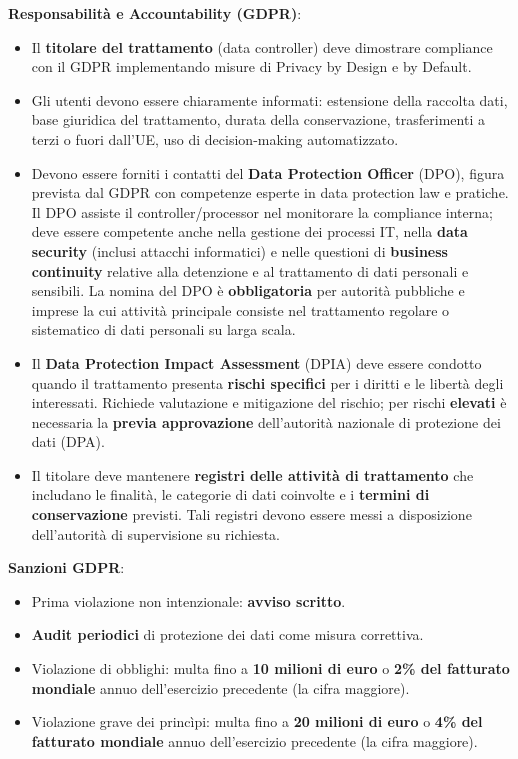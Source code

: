 \documentclass[a4paper,11pt]{article}
\begin{document}
\textbf{Responsabilit\`{a} e Accountability (GDPR)}:
\begin{itemize}
  \item Il \textbf{titolare del trattamento} (data controller) deve dimostrare compliance con il GDPR implementando misure di Privacy by Design e by Default.
  \item Gli utenti devono essere chiaramente informati: estensione della raccolta dati, base giuridica del trattamento, durata della conservazione, trasferimenti a terzi o fuori dall'UE, uso di decision-making automatizzato.
  \item Devono essere forniti i contatti del \textbf{Data Protection Officer} (DPO), figura prevista dal GDPR con competenze esperte in data protection law e pratiche. Il DPO assiste il controller/processor nel monitorare la compliance interna; deve essere competente anche nella gestione dei processi IT, nella \textbf{data security} (inclusi attacchi informatici) e nelle questioni di \textbf{business continuity} relative alla detenzione e al trattamento di dati personali e sensibili. La nomina del DPO \`{e} \textbf{obbligatoria} per autorit\`{a} pubbliche e imprese la cui attivit\`{a} principale consiste nel trattamento regolare o sistematico di dati personali su larga scala.
  \item Il \textbf{Data Protection Impact Assessment} (DPIA) deve essere condotto quando il trattamento presenta \textbf{rischi specifici} per i diritti e le libert\`{a} degli interessati. Richiede valutazione e mitigazione del rischio; per rischi \textbf{elevati} \`{e} necessaria la \textbf{previa approvazione} dell'autorit\`{a} nazionale di protezione dei dati (DPA).
  \item Il titolare deve mantenere \textbf{registri delle attivit\`{a} di trattamento} che includano le finalit\`{a}, le categorie di dati coinvolte e i \textbf{termini di conservazione} previsti. Tali registri devono essere messi a disposizione dell'autorit\`{a} di supervisione su richiesta.
\end{itemize}

\textbf{Sanzioni GDPR}:
\begin{itemize}
  \item Prima violazione non intenzionale: \textbf{avviso scritto}.
  \item \textbf{Audit periodici} di protezione dei dati come misura correttiva.
  \item Violazione di obblighi: multa fino a \textbf{10 milioni di euro} o \textbf{2\% del fatturato mondiale} annuo dell'esercizio precedente (la cifra maggiore).
  \item Violazione grave dei princìpi: multa fino a \textbf{20 milioni di euro} o \textbf{4\% del fatturato mondiale} annuo dell'esercizio precedente (la cifra maggiore).
\end{itemize}
\end{document}
